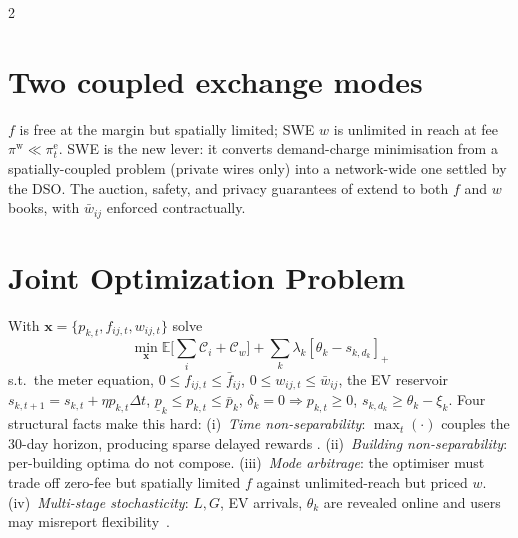 \documentclass[10pt]{article}
\begin{document}
\begin{multicols}{2}
\section*{Two coupled exchange modes}
$f$ is free at the margin but spatially limited; SWE $w$ is unlimited in
reach at fee $\pi^{\text{w}}\!\ll\!\pi^{\text{e}}_t$. SWE is the new
lever: it converts demand-charge minimisation from a spatially-coupled
problem (private wires only) into a network-wide one settled by the
DSO. The auction, safety, and privacy guarantees of
\cite{eisele2020Safe,laszka2018transax,eisele2020role} extend to both
$f$ and $w$ books, with $\bar{w}_{ij}$ enforced contractually.

\section*{Joint Optimization Problem}
With $\bm{x}\!=\!\{p_{k,t},f_{ij,t},w_{ij,t}\}$ solve
{\scriptsize
\[
\min_{\bm{x}} \mathbb{E}\!\Big[\textstyle\sum_i\mathcal{C}_i+\mathcal{C}_w\Big]
+\!\sum_k\lambda_k[\theta_k\!-\!s_{k,d_k}]_+
\]}%
s.t.\ the meter equation, $0\!\le\!f_{ij,t}\!\le\!\bar{f}_{ij}$,
$0\!\le\!w_{ij,t}\!\le\!\bar{w}_{ij}$, the EV reservoir $s_{k,t+1}\!=\!s_{k,t}\!+\!\eta p_{k,t}\Delta t$, $\underline{p}_k\!\le\!p_{k,t}\!\le\!\bar{p}_k$,
$\delta_k\!=\!0\!\Rightarrow\!p_{k,t}\!\ge\!0$, $s_{k,d_k}\!\ge\!\theta_k\!-\!\xi_k$.
Four structural facts make this hard:
(i)~\emph{Time non-separability}: $\max_t(\cdot)$ couples the 30-day
horizon, producing sparse delayed rewards
\cite{liu2024reinforcement,iccps2026_pv2b}.
(ii)~\emph{Building non-separability}: per-building optima do not compose.
(iii)~\emph{Mode arbitrage}: the optimiser must trade off zero-fee but
spatially limited $f$ against unlimited-reach but priced $w$.
(iv)~\emph{Multi-stage stochasticity}: $L,G$, EV arrivals, $\theta_k$
are revealed online and users may misreport
flexibility~\cite{sen2026negotiations}.


\end{multicols}
\end{document}
